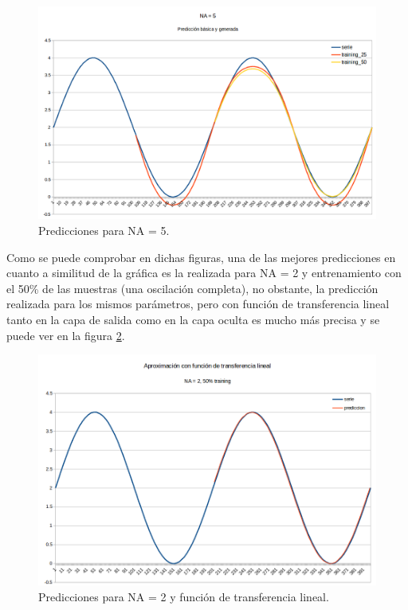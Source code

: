 \documentclass[spanish]{assignment}
\begin{document}
	\begin{figure}[h]
		\centering
		\includegraphics[scale=0.25]{predNA5.png}		
		\caption{Predicciones para NA = 5.}				
		\label{pred_no_lineal_end}
	\end{figure}
	
	Como se puede comprobar en dichas figuras, una de las mejores predicciones en cuanto a similitud de la gráfica es la realizada para NA = 2 y entrenamiento con el 50\% de las muestras (una oscilación completa), no obstante, la predicción realizada para los mismos parámetros, pero con función de transferencia lineal tanto en la capa de salida como en la capa oculta es mucho más precisa y se puede ver en la figura \ref{pred_lineal}.
	
	\begin{figure}[H]
		\centering
		\includegraphics[scale=0.25]{predNA2Lineal.png}		
		\caption{Predicciones para NA = 2 y función de transferencia lineal.}				
		\label{pred_lineal}
	\end{figure}
	
\end{document}
